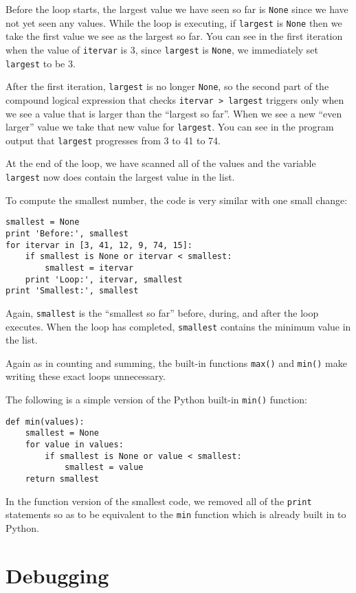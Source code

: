 Before the loop starts, the largest value we have seen so far 
is {\tt None} since we have not yet seen any values.  While the 
loop is executing, if {\tt largest} is {\tt None} then we take
the first value we see as the largest so far.   You can see in 
the first iteration when the value of {\tt itervar} is 3,
since {\tt largest} is {\tt None}, we immediately set 
{\tt largest} to be 3.

After the first iteration, {\tt largest} is no longer {\tt None},
so the second part of the compound logical expression that checks
{\tt itervar > largest} triggers only when we see a value that is
larger than the ``largest so far''.  When we see a new ``even larger''
value we take that new value for {\tt largest}.  You can see in the 
program output that {\tt largest} progresses from 3 to 41 to 74.

At the end of the loop, we have scanned all of the values and
the variable {\tt largest} now does contain the largest value
in the list.

To compute the smallest number, the code is very similar with one
small change:

\beforeverb
\begin{verbatim}
smallest = None
print 'Before:', smallest
for itervar in [3, 41, 12, 9, 74, 15]:
    if smallest is None or itervar < smallest:
        smallest = itervar
    print 'Loop:', itervar, smallest
print 'Smallest:', smallest
\end{verbatim}
\afterverb
%
Again, {\tt smallest} is the ``smallest so far'' before, during, and after the 
loop executes.  When the loop has completed, {\tt smallest} contains the
minimum value in the list.

Again as in counting and summing, the built-in functions 
{\tt max()} and {\tt min()} make writing these exact loops
unnecessary.

The following is a simple version of the Python built-in
{\tt min()} function:

\beforeverb
\begin{verbatim}
def min(values):
    smallest = None
    for value in values:
        if smallest is None or value < smallest:
            smallest = value
    return smallest
\end{verbatim}
\afterverb
%
In the function version of the smallest code, we removed all of the 
{\tt print} statements so as to be equivalent to the {\tt min} 
function which is already built in to Python.

\section{Debugging}

